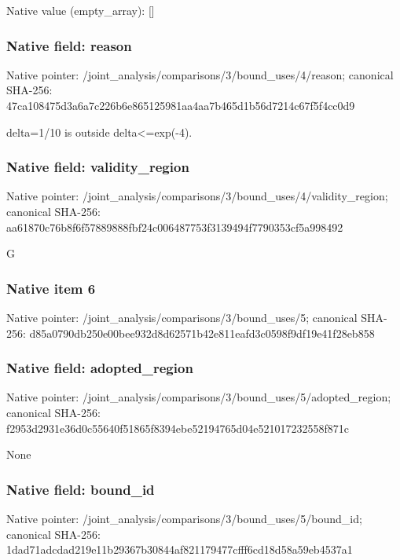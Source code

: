 \documentclass[10pt,a4paper]{article}
\begin{document}
Native value (empty\_\allowbreak{}array): []

\subsubsection{Native field: reason}
Native pointer: /joint\_\allowbreak{}analysis/comparisons/3/bound\_\allowbreak{}uses/4/reason; canonical SHA-256: 47ca108475d3a6a7c226b6e865125981aa4aa7b465d1b56d7214c67f5f4cc0d9

\begingroup\raggedright\sloppy delta=\allowbreak{}1/\allowbreak{}10 is outside delta<=\allowbreak{}exp(-4).\par\endgroup

\subsubsection{Native field: validity\_\allowbreak{}region}
Native pointer: /joint\_\allowbreak{}analysis/comparisons/3/bound\_\allowbreak{}uses/4/validity\_\allowbreak{}region; canonical SHA-256: aa61870c76b8f6f57889888fbf24c006487753f3139494f7790353cf5a998492

\begingroup\raggedright\sloppy G\par\endgroup

\subsubsection{Native item 6}
Native pointer: /joint\_\allowbreak{}analysis/comparisons/3/bound\_\allowbreak{}uses/5; canonical SHA-256: d85a0790db250e00bee932d8d62571b42e811eafd3c0598f9df19e41f28eb858

\subsubsection{Native field: adopted\_\allowbreak{}region}
Native pointer: /joint\_\allowbreak{}analysis/comparisons/3/bound\_\allowbreak{}uses/5/adopted\_\allowbreak{}region; canonical SHA-256: f2953d2931e36d0c55640f51865f8394ebe52194765d04e521017232558f871c

\begingroup\raggedright\sloppy None\par\endgroup

\subsubsection{Native field: bound\_\allowbreak{}id}
Native pointer: /joint\_\allowbreak{}analysis/comparisons/3/bound\_\allowbreak{}uses/5/bound\_\allowbreak{}id; canonical SHA-256: 1dad71adcdad219e11b29367b30844af821179477cfff6cd18d58a59eb4537a1
\end{document}
